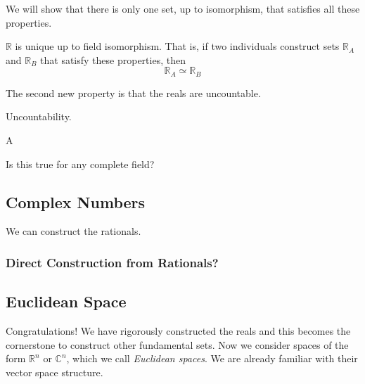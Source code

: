 \documentclass{article}
\begin{document}
      We will show that there is only one set, up to isomorphism, that satisfies all these properties. 

      \begin{theorem}[Uniqueness]
        $\mathbb{R}$ is unique up to field isomorphism. That is, if two individuals construct sets  $\mathbb{R}_A$ and $\mathbb{R}_B$ that satisfy these properties, then 
        \begin{equation}
          \mathbb{R}_A \simeq \mathbb{R}_B
        \end{equation}
      \end{theorem} 

      The second new property is that the reals are uncountable. 

      \begin{theorem}
        Uncountability. 
      \end{theorem} 

      \begin{theorem}
        
      \end{theorem}

      \begin{theorem}[Denseness]
        A 
      \end{theorem}

      \begin{theorem}
        Is this true for any complete field? 
      \end{theorem}
     
  \subsection{Complex Numbers} 

    We can construct the rationals. 

    \subsubsection{Direct Construction from Rationals?}

  \subsection{Euclidean Space} 

    Congratulations! We have rigorously constructed the reals and this becomes the cornerstone to construct other fundamental sets. Now we consider spaces of the form $\mathbb{R}^n$ or $\mathbb{C}^n$, which we call \textit{Euclidean spaces}. We are already familiar with their vector space structure. 
\end{document}
